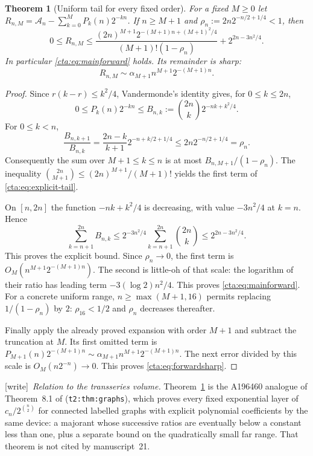 \documentclass[11pt]{article}
\newtheorem{theorem}{Theorem}[section]
\theoremstyle{definition}
\theoremstyle{remark}
\newcommand{\As}{\mathcal A}
\newcommand{\wtag}{\textup{[write]}}
\begin{document}
\begin{theorem}[Uniform tail for every fixed order]\label{cta:thm:tail}
For a fixed $M\geq0$ let
$R_{n,M}=\As_n-\sum_{k=0}^MP_k(n)2^{-kn}$.
If $n\geq M+1$ and $\rho_n:=2n2^{-n/2+1/4}<1$, then
\begin{equation}\label{cta:eq:explicit-tail}
 0\leq R_{n,M}\leq
 \frac{(2n)^{M+1}2^{-(M+1)n+(M+1)^2/4}}
      {(M+1)!(1-\rho_n)}
       +2^{2n-3n^2/4}.
\end{equation}
In particular \eqref{cta:eq:mainforward} holds. Its remainder is sharp:
\begin{equation}\label{cta:eq:forwardsharp}
 R_{n,M}\sim\alpha_{M+1}n^{M+1}2^{-(M+1)n}.
\end{equation}
\end{theorem}
\begin{proof}
Since $r(k-r)\leq k^2/4$, Vandermonde's identity gives, for $0\leq k\leq2n$,
\begin{equation}\label{cta:eq:majorant}
 0\leq P_k(n)2^{-kn}
 \leq B_{n,k}:=\binom{2n}k2^{-nk+k^2/4}.
\end{equation}
For $0\leq k<n$,
\[
 \frac{B_{n,k+1}}{B_{n,k}}
 =\frac{2n-k}{k+1}2^{-n+k/2+1/4}
 \leq2n2^{-n/2+1/4}=\rho_n.
\]
Consequently the sum over $M+1\leq k\leq n$ is at most
$B_{n,M+1}/(1-\rho_n)$. The inequality
$\binom{2n}{M+1}\leq(2n)^{M+1}/(M+1)!$ yields the first term of
\eqref{cta:eq:explicit-tail}.

On $[n,2n]$ the function $-nk+k^2/4$ is decreasing, with value
$-3n^2/4$ at $k=n$. Hence
\[
 \sum_{k=n+1}^{2n}B_{n,k}
 \leq2^{-3n^2/4}\sum_{k=n+1}^{2n}\binom{2n}k
 \leq2^{2n-3n^2/4}.
\]
This proves the explicit bound. Since $\rho_n\to0$, the first term is
$O_M(n^{M+1}2^{-(M+1)n})$. The second is little-oh of that scale:
the logarithm of their ratio has leading term $-3(\log2)n^2/4$.
This proves \eqref{cta:eq:mainforward}. For a concrete uniform range,
$n\geq\max(M+1,16)$ permits replacing $1/(1-\rho_n)$ by $2$:
$\rho_{16}<1/2$ and $\rho_n$ decreases thereafter.

Finally apply the already proved expansion with order $M+1$ and subtract
the truncation at $M$. Its first omitted term is
$P_{M+1}(n)2^{-(M+1)n}\sim\alpha_{M+1}n^{M+1}2^{-(M+1)n}$.
The next error divided by this scale is $O_M(n2^{-n})\to0$.
This proves \eqref{cta:eq:forwardsharp}.
\end{proof}

\wtag\ \emph{Relation to the transseries volume.} Theorem~\ref{cta:thm:tail}
is the A196460 analogue of Theorem~8.1 of \cite{cti}
(\texttt{t2:thm:graphs}), which proves every fixed exponential layer of
$c_n/2^{\binom n2}$ for connected labelled graphs with explicit polynomial
coefficients by the same device: a majorant whose successive ratios are
eventually below a constant less than one, plus a separate bound on the
quadratically small far range. That theorem is not cited by manuscript~21.
\end{document}
